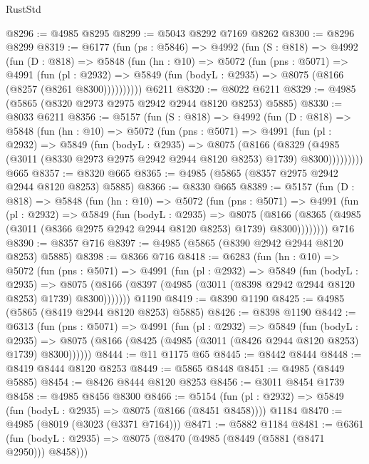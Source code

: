 \begin{lexlean}{RustStd}
\begin{coremodule}
@8296 := @4985 @8295
@8299 := @5043 @8292 @7169 @8262
@8300 := @8296 @8299
@8319 := @6177
    (fun (ps : @5846) =>
    @4992
      (fun (S : @818) =>
      @4992
        (fun (D : @818) =>
        @5848
          (fun (hn : @10) =>
          @5072
            (fun (pns : @5071) =>
            @4991
              (fun (pl : @2932) =>
              @5849 (fun (bodyL : @2935) => @8075 (@8166 (@8257 (@8261 @8300))))))))))
    @6211
@8320 := @8022 @6211
@8329 := @4985 (@5865 (@8320 @2973 @2975 @2942 @2944 @8120 @8253) @5885)
@8330 := @8033 @6211
@8356 := @5157
    (fun (S : @818) =>
    @4992
      (fun (D : @818) =>
      @5848
        (fun (hn : @10) =>
        @5072
          (fun (pns : @5071) =>
          @4991
            (fun (pl : @2932) =>
            @5849
              (fun (bodyL : @2935) =>
              @8075
                (@8166
                  (@8329
                    (@4985 (@3011 (@8330 @2973 @2975 @2942 @2944 @8120 @8253) @1739) @8300)))))))))
    @665
@8357 := @8320 @665
@8365 := @4985 (@5865 (@8357 @2975 @2942 @2944 @8120 @8253) @5885)
@8366 := @8330 @665
@8389 := @5157
    (fun (D : @818) =>
    @5848
      (fun (hn : @10) =>
      @5072
        (fun (pns : @5071) =>
        @4991
          (fun (pl : @2932) =>
          @5849
            (fun (bodyL : @2935) =>
            @8075
              (@8166 (@8365 (@4985 (@3011 (@8366 @2975 @2942 @2944 @8120 @8253) @1739) @8300))))))))
    @716
@8390 := @8357 @716
@8397 := @4985 (@5865 (@8390 @2942 @2944 @8120 @8253) @5885)
@8398 := @8366 @716
@8418 := @6283
    (fun (hn : @10) =>
    @5072
      (fun (pns : @5071) =>
      @4991
        (fun (pl : @2932) =>
        @5849
          (fun (bodyL : @2935) =>
          @8075 (@8166 (@8397 (@4985 (@3011 (@8398 @2942 @2944 @8120 @8253) @1739) @8300)))))))
    @1190
@8419 := @8390 @1190
@8425 := @4985 (@5865 (@8419 @2944 @8120 @8253) @5885)
@8426 := @8398 @1190
@8442 := @6313
    (fun (pns : @5071) =>
    @4991
      (fun (pl : @2932) =>
      @5849
        (fun (bodyL : @2935) =>
        @8075 (@8166 (@8425 (@4985 (@3011 (@8426 @2944 @8120 @8253) @1739) @8300))))))
@8444 := @11 @1175 @65
@8445 := @8442 @8444
@8448 := @8419 @8444 @8120 @8253
@8449 := @5865 @8448
@8451 := @4985 (@8449 @5885)
@8454 := @8426 @8444 @8120 @8253
@8456 := @3011 @8454 @1739
@8458 := @4985 @8456 @8300
@8466 := @5154
    (fun (pl : @2932) => @5849 (fun (bodyL : @2935) => @8075 (@8166 (@8451 @8458))))
    @1184
@8470 := @4985 (@8019 (@3023 (@3371 @7164)))
@8471 := @5882 @1184
@8481 := @6361
    (fun (bodyL : @2935) => @8075 (@8470 (@4985 (@8449 (@5881 (@8471 @2950))) @8458)))

\end{coremodule}
\end{lexlean}
